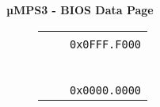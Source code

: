 \documentclass{beamer}
\begin{document}
\begin{frame}
\begin{center}
\begin{minipage}{0.47\textwidth}
\begin{block}{\textbf{{\small µMPS3 - BIOS Data Page}}}
\begin{figure}[h]
\begin{tabular}{rcl}
						\multicolumn{1}{l|}{}                                                    & \multicolumn{1}{c|}{\cellcolor{nord15}}                                                        &                                               \\
						\multicolumn{1}{l|}{}                                                    & \multicolumn{1}{c|}{\multirow{-2}{*}{\cellcolor{nord15}{\scriptsize \textit{BIOS Data Page}}}} & \multirow{2}{*}{\texttt{{\tiny 0x0FFF.F000}}} \\ \hhline{~-~}
						\multicolumn{1}{l|}{}                                                    & \multicolumn{1}{c|}{\cellcolor{nord9}}                                                         &                                               \\
						\multicolumn{1}{l|}{}                                                    & \multicolumn{1}{c|}{\cellcolor{nord9}}                                                         &                                               \\
						\multicolumn{1}{l|}{}                                                    & \multicolumn{1}{c|}{\cellcolor{nord9}}                                                         &                                               \\
						\multicolumn{1}{l|}{}                                                    & \multicolumn{1}{c|}{\cellcolor{nord9}}                                                         &                                               \\
						\multicolumn{1}{l|}{}                                                    & \multicolumn{1}{c|}{\cellcolor{nord9}}                                                         &                                               \\
						\multicolumn{1}{l|}{}                                                    & \multicolumn{1}{c|}{\cellcolor{nord9}}                                                         &                                               \\
						\multicolumn{1}{l|}{}                                                    & \multicolumn{1}{c|}{\cellcolor{nord9}}                                                         &                                               \\
						\multicolumn{1}{l|}{}                                                    & \multicolumn{1}{c|}{\cellcolor{nord9}}                                                         & \multirow{2}{*}{\texttt{{\tiny 0x0000.0000}}} \\ \hhline{--~}

\end{tabular}
\end{figure}
\end{block}
\end{minipage}
\end{center}
\end{frame}
\end{document}
